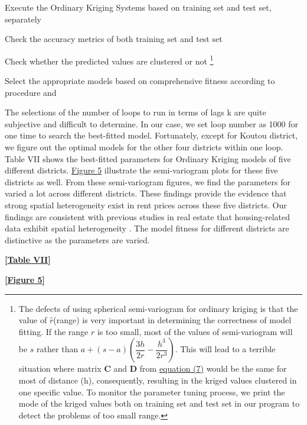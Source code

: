 \documentclass[a4paper, 12pt]{article} %
\newcommand*\circled[1]{\tikz[baseline=(char.base)]{
            \node[shape=circle,draw,inner sep=2pt] (char) {#1};}}
\begin{document}
\noindent \circled{3} Execute the Ordinary Kriging Systems based on training set and test set, separately

\noindent \circled{4} Check the accuracy metrics of both training set and test set

\noindent \circled{5} Check whether the predicted values are clustered or not \footnote{The defects of using spherical semi-variogram for ordinary kriging is that the value of $\widehat{r}$(range) is very important in determining the correctness of model fitting. If the range $r$ is too small, most of the values of semi-variogram will be $s$ rather than $a + (s-a)(\dfrac{3h}{2r} - \dfrac{h^3}{2r^3})$. This will lead to a terrible situation where matrix $\boldsymbol{C}$ and $\boldsymbol{D}$ from \hyperref[eq7]{equation (7)} would be the same for most of distance (h), consequently, resulting in the kriged values clustered in one specific value. To monitor the parameter tuning process, we print the mode of the kriged values both on training set and test set in our program to detect the problems of too small range.}

\noindent \circled{6} Select the appropriate models based on comprehensive fitness according to procedure \circled{4} and \circled{5} 

The selections of the number of loops to run in terms of lags k are quite subjective and difficult to determine. In our case, we set loop number as 1000 for one time to search the best-fitted model. Fortunately, except for Koutou district, we figure out the optimal models for the other four districts within one loop. Table VII shows the best-fitted parameters for Ordinary Kriging models of five different districts. \hyperref[fig5]{Figure 5} illustrate the semi-variogram plots for these five districts as well. From these semi-variogram figures, we find the parameters for varied a lot across different districts. These findings provide the evidence that strong spatial heterogeneity exist in rent prices across these five districts. Our findings are consistent with previous studies in real estate that housing-related data exhibit spatial heterogeneity \citep{anselin2003spatial, goodman2003housing, khalid2015spatial}. The model fitness for different districts are distinctive as the parameters are varied.

\bigskip
 \centerline{\bf [\hyperref[tb7]{Table VII}]}
\bigskip

\bigskip
 \centerline{\bf [\hyperref[fig5]{Figure 5}]}
\bigskip
\end{document}
